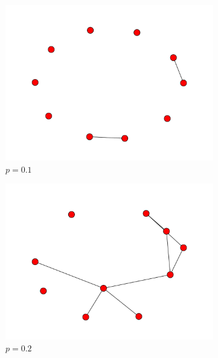 \documentclass[10pt,a4paper]{scrartcl}
\begin{document}
\begin{figure}[hh!]
\begin{center}
        \begin{subfigure}[b]{0.45\textwidth}
                \includegraphics[width=\textwidth]{figures/ER_graph_1.pdf}
                \caption{$p=0.1$}
        \end{subfigure}
	 \begin{subfigure}[b]{0.45\textwidth}
                \includegraphics[width=\textwidth]{figures/ER_graph_2.pdf}
                \caption{$p=0.2$}
        \end{subfigure}
	 \begin{subfigure}[b]{0.45\textwidth}

\end{subfigure}
\end{center}
\end{figure}
\end{document}
